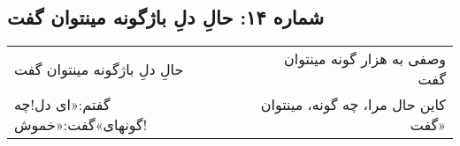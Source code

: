 \begin{center}
\section*{شماره ۱۴: حالِ دلِ باژگونه مینتوان گفت}
\label{sec:014}
\begin{longtable}{l p{0.5cm} r}
حالِ دلِ باژگونه مینتوان گفت
&&
وصفی به هزار گونه مینتوان گفت
\\
گفتم:«ای دل!‌چه گونهای»گفت:«خموش!
&&
کاین حال مرا، چه گونه، مینتوان گفت»
\\
\end{longtable}
\end{center}
